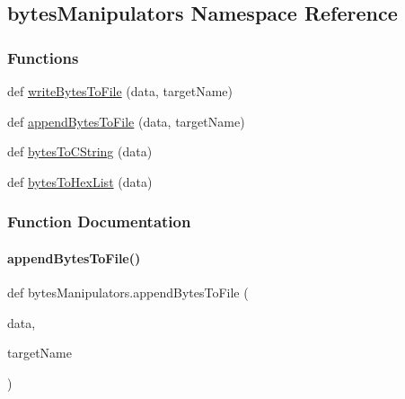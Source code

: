 \hypertarget{namespacebytes_manipulators}{}\subsection{bytes\+Manipulators Namespace Reference}
\label{namespacebytes_manipulators}
\subsubsection*{Functions}
\begin{DoxyCompactItemize}
\item 
def \hyperlink{namespacebytes_manipulators_a2a3a7daebf72b630c1197254cc7eda9f}{write\+Bytes\+To\+File} (data, target\+Name)
\item 
def \hyperlink{namespacebytes_manipulators_acbcbfa44a9a0a28f5a4143d2daf80e9e}{append\+Bytes\+To\+File} (data, target\+Name)
\item 
def \hyperlink{namespacebytes_manipulators_a11e06e864ff0b0ca373b61287fec1a24}{bytes\+To\+C\+String} (data)
\item 
def \hyperlink{namespacebytes_manipulators_a4cd5a54a23d33c32af9524eb31bbe1d0}{bytes\+To\+Hex\+List} (data)
\end{DoxyCompactItemize}


\subsubsection{Function Documentation}
\mbox{\label{namespacebytes_manipulators_acbcbfa44a9a0a28f5a4143d2daf80e9e}} 
\paragraph{\texorpdfstring{append\+Bytes\+To\+File()}{appendBytesToFile()}}
{\footnotesize\ttfamily def bytes\+Manipulators.\+append\+Bytes\+To\+File (\begin{DoxyParamCaption}\item[{}]{data,  }\item[{}]{target\+Name }\end{DoxyParamCaption})}

\mbox{\label{namespacebytes_manipulators_a11e06e864ff0b0ca373b61287fec1a24}} 
